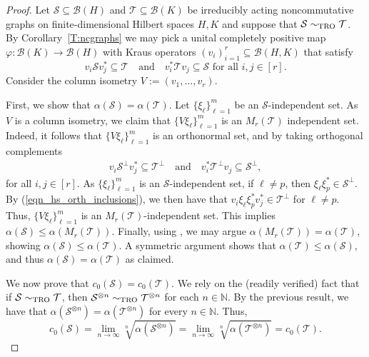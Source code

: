 \documentclass[11pt]{amsart}
\numberwithin{equation}{section}
\theoremstyle{plain}
\theoremstyle{definition}
\theoremstyle{remark}
\newcommand{\B}{{\mathcal{B}}}
\renewcommand{\S}{{\mathcal{S}}}
\newcommand{\T}{{\mathcal{T}}}
\newcommand\vphi{\varphi}
\newcommand{\bN}{\mathbb{N}}
\newcommand{\foral}{\text{ for all }}
\newcommand{\qand}{\quad\text{and}\quad}
\begin{document}
\begin{proof}
Let $\S \subseteq \B(H)$ and $\T \subseteq \B(K)$  be irreducibly acting noncommutative graphs on finite-dimensional Hilbert spaces $H, K$  and suppose that $\S\sim_{\rm TRO} \T$.
By Corollary~\ref{T:ncgraphs} we may pick a  unital completely positive map $\vphi\colon \B(K)\rightarrow \B(H)$ with Kraus operators $(v_i)_{i=1}^r\subseteq \B(H,K)$ that satisfy
\[
v_{i}\S v_{j}^* \subseteq \T \qand v_{i}^*\T v_{j} \subseteq \S \foral i, j \in [r].
\]
Consider the column isometry $V:= (v_{1}, \dots, v_{r})$.

First, we show that $\alpha(\S) = \alpha(\T)$. Let $\{\xi_{\ell}\}_{\ell=1}^{m}$ be an $\S$-independent set. As $V$ is a column isometry, we claim that $\{V\xi_{\ell}\}_{\ell=1}^{m}$ is an $M_{r}(\T)$ independent set. Indeed, it follows that $\{V\xi_{\ell}\}_{\ell=1}^{m}$ is an orthonormal set, and by taking orthogonal complements 
\begin{gather}\label{eqn_hs_orth_inclusions}
v_{i}\S^{\perp}v_{j}^* \subseteq \T^{\perp} \qand v_{i}^*\T^{\perp}v_{j}  \subseteq \S^{\perp},
\end{gather}
for all $i, j \in [r]$. As $\{\xi_{\ell}\}_{\ell=1}^{m}$ is an $\S$-independent set, if $\ell \neq p$, then $\xi_{\ell}\xi_{p}^* \in \S^{\perp}$. By (\ref{eqn_hs_orth_inclusions}), we then have that $v_{i}\xi_{\ell}\xi_{p}^*v_{j}^* \in \T^{\perp}$ for $\ell \neq p$. Thus, $\{V\xi_{\ell}\}_{\ell=1}^{m}$ is an $M_{r}(\T)$-independent set. This implies $\alpha(\S) \leq \alpha(M_{r}(\T))$. Finally, using \cite[Remark IV.6]{LPT18}, we may argue $\alpha(M_{r}(\T)) = \alpha(\T)$, showing $\alpha(\S) \leq \alpha(\T)$. A symmetric argument shows that $\alpha(\T) \leq \alpha(\S)$, and thus $\alpha(\S) = \alpha(\T)$ as claimed.

We now prove that $c_{0}(\S) = c_{0}(\T)$. We rely on the (readily verified) fact that if $\S \sim_{\rm TRO} \T$, then $\S^{\otimes n} \sim_{\rm TRO} \T^{\otimes n}$  for each $n \in \bN$. By the previous result, we have that $\alpha(\S^{\otimes n}) = \alpha(\T^{\otimes n})$ for every $n \in \mathbb{N}$. Thus,
\[
c_{0}(\S) = \lim\limits_{n\rightarrow \infty}\sqrt[n]{\alpha(\S^{\otimes n})} = \lim\limits_{n\rightarrow \infty}\sqrt[n]{\alpha(\T^{\otimes n})} = c_{0}(\T).
\]


\end{proof}
\end{document}
